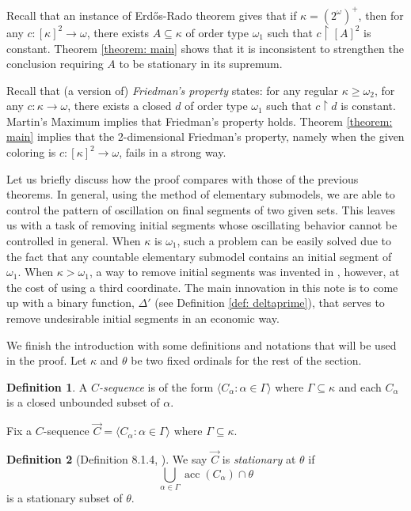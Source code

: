 \documentclass[12pt]{amsart}
\theoremstyle{definition}
\newtheorem{definition}{Definition}[section]
\theoremstyle{plain}
\theoremstyle{plain}
\DeclareMathOperator{\acc}{acc}
\begin{document}
Recall that an instance of Erd\H{o}s-Rado theorem  \cite{ErdosRado} gives that if $\kappa=(2^\omega)^+$, then for any $c: [\kappa]^2\to \omega$, there exists $A\subseteq \kappa$ of order type $\omega_1$ such that $c\restriction [A]^2$ is constant. Theorem \ref{theorem: main} shows that it is inconsistent to strengthen the conclusion requiring $A$ to be stationary in its supremum.

Recall that (a version of) \emph{Friedman's property} states: for any regular $\kappa\geq \omega_2$, for any $c: \kappa \to \omega$, there exists a closed $d$ of order type $\omega_1$ such that $c\restriction d$ is constant. Martin's Maximum \cite{MM} implies that Friedman's property holds. Theorem \ref{theorem: main} implies that the 2-dimensional Friedman's property, namely when the given coloring is $c: [\kappa]^2\to \omega$, fails in a strong way.


Let us briefly discuss how the proof compares with those of the previous theorems. In general, using the method of elementary submodels, we are able to control the pattern of oscillation on final segments of two given sets. This leaves us with a task of removing initial segments whose oscillating behavior cannot be controlled in general. When $\kappa$ is $\omega_1$, such a problem can be easily solved due to the fact that any countable elementary submodel contains an initial segment of $\omega_1$. When $\kappa>\omega_1$, a way to remove initial segments was invented in \cite{Todorcevic3D}, however, at the cost of using a third coordinate.   The main innovation in this note is to come up with a binary function, $\Delta'$ (see Definition \ref{def: deltaprime}), that serves to remove undesirable initial segments in an economic way.


We finish the introduction with some definitions and notations that will be used in the proof. Let $\kappa$ and $\theta$ be two fixed ordinals for the rest of the section.


 
\begin{definition}
A \emph{$C$-sequence} is of the form $\langle C_\alpha: \alpha\in \Gamma\rangle$ where $\Gamma\subseteq \kappa$ and each $C_\alpha$ is a closed unbounded subset of $\alpha$.
\end{definition}

Fix a $C$-sequence $\vec{C}=\langle C_\alpha: \alpha\in \Gamma\rangle$ where $\Gamma\subseteq \kappa$.
 
\begin{definition}[Definition 8.1.4, \cite{walksbook}]\label{def: stationaryCseq}
We say $\vec{C}$ is \emph{stationary} at $\theta$ if $$\bigcup_{\alpha\in \Gamma} \acc(C_\alpha) \cap \theta$$ is a stationary subset of $\theta$.
\end{definition}
\end{document}
